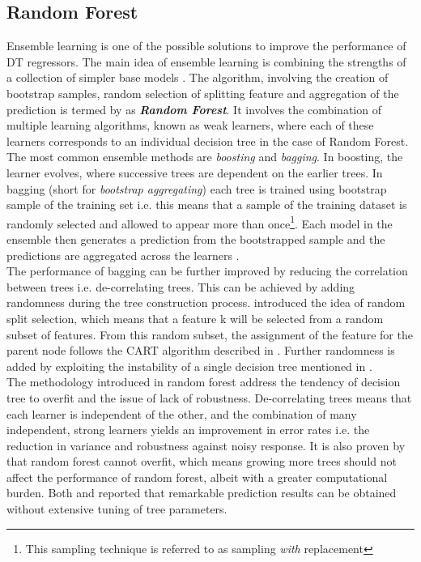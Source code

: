 \subsection{Random Forest}\label{sec:rf_theo}

Ensemble learning is one of the possible solutions to improve the performance of DT regressors. The main idea of ensemble learning is combining the strengths of a collection of simpler base models . The algorithm, involving the creation of bootstrap samples, random selection of splitting feature and aggregation of the prediction is termed by  as \textbf{\emph{Random Forest}}. It involves the combination of multiple learning algorithms, known as weak learners, where each of these learners corresponds to an individual decision tree in the case of Random Forest.\\

The most common ensemble methods are \emph{boosting} and \emph{bagging}. In boosting, the learner evolves, where successive trees are dependent on the earlier trees. In bagging (short for \emph{bootstrap aggregating}) each tree is trained using bootstrap sample of the training set i.e. this means that a sample of the training dataset is randomly selected and allowed to appear more than once\footnote{This sampling technique is referred to as sampling \emph{with} replacement}. Each model in the ensemble then generates a prediction from the bootstrapped sample and the predictions are aggregated across the learners .\\

The performance of bagging can be further improved by reducing the correlation between trees i.e. de-correlating trees. This can be achieved by adding randomness during the tree construction process.  introduced the idea of random split selection, which means that a feature k will be selected from a random subset of features. From this random subset, the assignment of the feature for the parent node follows the CART algorithm described in . Further randomness is added by exploiting the instability of a single decision tree mentioned in .\\

The methodology introduced in random forest address the tendency of decision tree to overfit and the issue of lack of robustness. De-correlating trees means that each learner is independent of the other, and the combination of many independent, strong learners yields an improvement in error rates i.e. the reduction in variance and robustness against noisy response. It is also proven by  that random forest cannot overfit, which means growing more trees should not affect the performance of random forest, albeit with a greater computational burden. Both  and  reported that remarkable prediction results can be obtained without extensive tuning of tree parameters. \\

